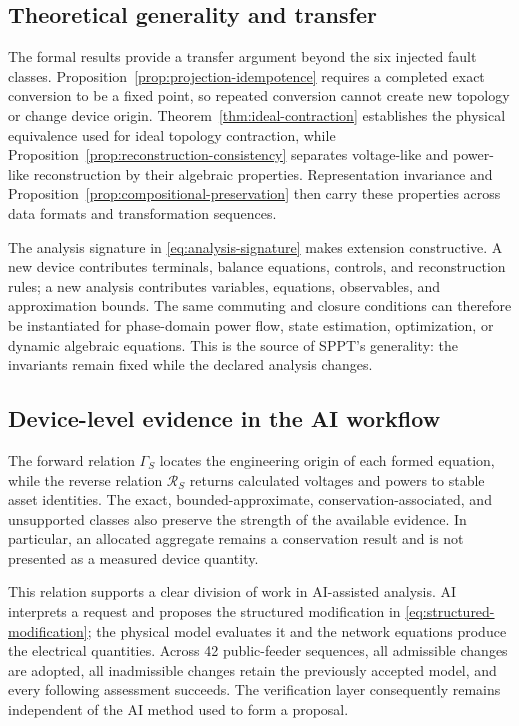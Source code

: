 \documentclass[final,5p,times,twocolumn]{elsarticle}
\newcommand{\Rmap}{\mathcal R}
\begin{document}
\subsection{Theoretical generality and transfer}

The formal results provide a transfer argument beyond the six injected fault
classes. Proposition~\ref{prop:projection-idempotence} requires a completed
exact conversion to be a fixed point, so repeated conversion cannot create new
topology or change device origin. Theorem~\ref{thm:ideal-contraction} establishes
the physical equivalence used for ideal topology contraction, while
Proposition~\ref{prop:reconstruction-consistency} separates voltage-like and
power-like reconstruction by their algebraic properties. Representation
invariance and Proposition~\ref{prop:compositional-preservation} then carry
these properties across data formats and transformation sequences.

The analysis signature in \eqref{eq:analysis-signature} makes extension
constructive. A new device contributes terminals, balance equations, controls,
and reconstruction rules; a new analysis contributes variables, equations,
observables, and approximation bounds. The same commuting and closure
conditions can therefore be instantiated for phase-domain power flow, state
estimation, optimization, or dynamic algebraic equations. This is the source of
SPPT's generality: the invariants remain fixed while the declared analysis
changes.

\subsection{Device-level evidence in the AI workflow}

The forward relation $\Gamma_S$ locates the engineering origin of each formed
equation, while the reverse relation $\Rmap_S$ returns calculated voltages and
powers to stable asset identities. The exact, bounded-approximate,
conservation-associated, and unsupported classes also preserve the strength of
the available evidence. In particular, an allocated aggregate remains a
conservation result and is not presented as a measured device quantity.

This relation supports a clear division of work in AI-assisted analysis. AI
interprets a request and proposes the structured modification in
\eqref{eq:structured-modification}; the physical model evaluates it and the
network equations produce the electrical quantities. Across 42 public-feeder
sequences, all admissible changes are adopted, all inadmissible changes retain
the previously accepted model, and every following assessment succeeds. The
verification layer consequently remains independent of the AI method used to
form a proposal.
\end{document}
